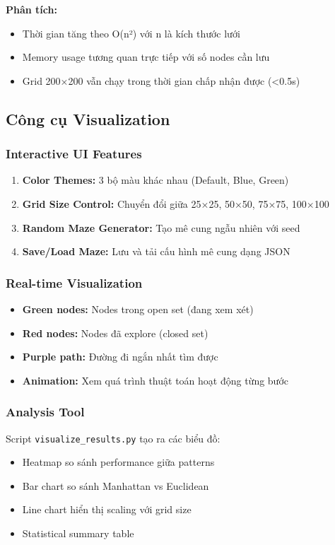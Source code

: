 \documentclass[12pt,a4paper]{article}
\begin{document}
\textbf{Phân tích:}
\begin{itemize}
    \item Thời gian tăng theo O(n²) với n là kích thước lưới
    \item Memory usage tương quan trực tiếp với số nodes cần lưu
    \item Grid 200×200 vẫn chạy trong thời gian chấp nhận được (<0.5s)
\end{itemize}

\subsection{Công cụ Visualization}

\subsubsection{Interactive UI Features}
\begin{enumerate}
    \item \textbf{Color Themes:} 3 bộ màu khác nhau (Default, Blue, Green)
    \item \textbf{Grid Size Control:} Chuyển đổi giữa 25×25, 50×50, 75×75, 100×100
    \item \textbf{Random Maze Generator:} Tạo mê cung ngẫu nhiên với seed
    \item \textbf{Save/Load Maze:} Lưu và tải cấu hình mê cung dạng JSON
\end{enumerate}

\subsubsection{Real-time Visualization}
\begin{itemize}
    \item \textbf{Green nodes:} Nodes trong open set (đang xem xét)
    \item \textbf{Red nodes:} Nodes đã explore (closed set)
    \item \textbf{Purple path:} Đường đi ngắn nhất tìm được
    \item \textbf{Animation:} Xem quá trình thuật toán hoạt động từng bước
\end{itemize}

\subsubsection{Analysis Tool}
Script \texttt{visualize\_results.py} tạo ra các biểu đồ:
\begin{itemize}
    \item Heatmap so sánh performance giữa patterns
    \item Bar chart so sánh Manhattan vs Euclidean
    \item Line chart hiển thị scaling với grid size
    \item Statistical summary table
\end{itemize}
\end{document}
